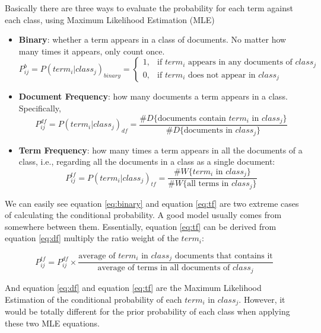 \documentclass{article}
\begin{document}
Basically there are three ways to evaluate the probability for each term against each class, using Maximum Likelihood Estimation (MLE) 
\begin{itemize}
	\item \textbf{Binary}: whether a term appears in a class of documents. No matter how many times it appears, only count once.
	\begin{equation}\label{eq:binary}
		P_{ij}^{b}=P(term_i|class_j)_{binary}=\begin{cases}
				1, & \text{if $term_i$ appears in any documents of $class_j$}  \\
				0, & \text{if $term_i$ does not appear in $class_j$}
		\end{cases}
	\end{equation}
	\item \textbf{Document Frequency}: how many documents a term appears in a class. Specifically, 
	\begin{equation}\label{eq:df}
		P_{ij}^{df}=P(term_i|class_j)_{df}=\frac{\#D\{\text{documents contain $term_i$ in $class_j$}\}}{\#D\{\text{documents in $class_j$}\}}
	\end{equation}
	\item \textbf{Term Frequency}: how many times a term appears in all the documents of a class, i.e., regarding all the documents in a class as a single document:
	\begin{equation}\label{eq:tf}
		P_{ij}^{tf}=P(term_i|class_j)_{tf}=\frac{\#W\{\text{$term_i$ in $class_j$}\}}{\#W\{\text{all terms in $class_j$}\}}
	\end{equation}
\end{itemize}

We can easily see equation \ref{eq:binary} and equation \ref{eq:tf} are two extreme cases of calculating the conditional probability. A good model usually comes from somewhere between them. Essentially, equation \ref{eq:tf} can be derived from equation \ref{eq:df} multiply the ratio weight of the $term_i$:

\begin{equation} \label{eq:tf-df}
	P_{ij}^{tf}=P_{ij}^{df} \times \frac{\text{average of $term_i$ in $class_j$ documents that contains it}}{\text{average of terms in all documents of $class_j$}}  
\end{equation}

And equation \ref{eq:df} and equation \ref{eq:tf} are the Maximum Likelihood Estimation of the conditional probability of each $term_i$ in $class_j$. However, it would be totally different for the prior probability of each class when applying these two MLE equations. 
\end{document}
